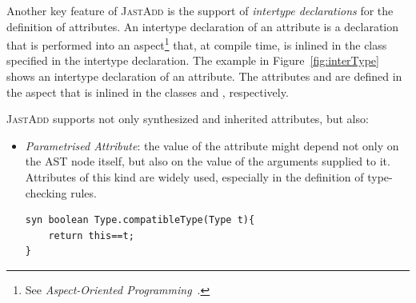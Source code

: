 Another key feature of \textsc{JastAdd}  is the support of \emph{intertype declarations} for the definition of attributes.
An intertype declaration of an attribute is a declaration that is performed into
an aspect\footnote{See \emph{Aspect-Oriented Programming}~\cite{Kiczales1997Aspect}.} that, at compile time,
is inlined in the class specified in the intertype declaration. The example in Figure~\ref{fig:interType}
shows an intertype declaration of an attribute.
The attributes  and  are defined in the aspect 
that is inlined in the classes  and , respectively.

\textsc{JastAdd} supports not only synthesized and inherited attributes, but also:
\begin{itemize}
    \item \emph{Parametrised Attribute}: the value of the attribute might depend
    not only on the AST node itself, but also on the value of the arguments supplied
    to it. Attributes of this kind are widely used, especially in the definition of
    type-checking rules.
    \begin{lstlisting}[language=JastAdd]
syn boolean Type.compatibleType(Type t){
    return this==t;
}
    \end{lstlisting}


\end{itemize}
